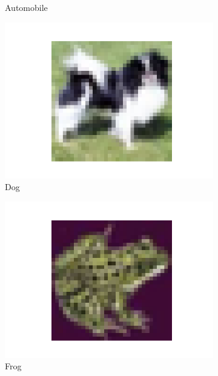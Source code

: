 \documentclass[letterpaper]{article} %
\begin{document}
\begin{figure}[htbp]
\begin{subfigure}{0.115\textwidth}
  \caption{Automobile}
\end{subfigure}\hfil
\begin{subfigure}{0.115\textwidth}
  \includegraphics[width=\linewidth]{cifar-10_5.png}
  \caption{Dog}
\end{subfigure}\hfil
\begin{subfigure}{0.115\textwidth}
  \includegraphics[width=\linewidth]{cifar-10_6.png}
  \caption{Frog}
\end{subfigure}\hfil
\begin{subfigure}{0.115\textwidth}

\end{subfigure}
\end{figure}
\end{document}
